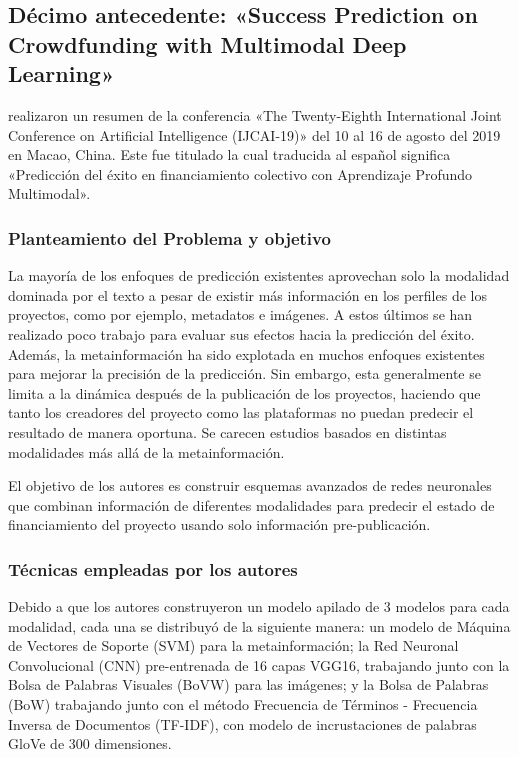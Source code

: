 \subsection{Décimo antecedente: «Success Prediction on Crowdfunding with Multimodal Deep Learning» \citep*{pr_cheng2019deeplearning}}
\citeauthor{pr_cheng2019deeplearning} realizaron un resumen de la conferencia «The Twenty-Eighth International Joint Conference on Artificial Intelligence (IJCAI-19)» del 10 al 16 de agosto del 2019 en Macao, China. Este fue titulado  la cual traducida al español significa «Predicción del éxito en financiamiento colectivo con Aprendizaje Profundo Multimodal».

\subsubsection{Planteamiento del Problema y objetivo}
La mayoría de los enfoques de predicción existentes aprovechan solo la modalidad dominada por el texto a pesar de existir más información en los perfiles de los proyectos, como por ejemplo, metadatos e imágenes. A estos últimos se han realizado poco trabajo para evaluar sus efectos hacia la predicción del éxito. Además, la metainformación ha sido explotada en muchos enfoques existentes para mejorar la precisión de la predicción. Sin embargo, esta generalmente se limita a la dinámica después de la publicación de los proyectos, haciendo que tanto los creadores del proyecto como las plataformas no puedan predecir el resultado de manera oportuna. Se carecen estudios basados en distintas modalidades más allá de la metainformación.

El objetivo de los autores es construir esquemas avanzados de redes neuronales que combinan información de diferentes modalidades para predecir el estado de financiamiento del proyecto usando solo información pre-publicación.

\subsubsection{Técnicas empleadas por los autores}
Debido a que los autores construyeron un modelo apilado de 3 modelos para cada modalidad, cada una se distribuyó de la siguiente manera: un modelo de Máquina de Vectores de Soporte (SVM) para la metainformación; la Red Neuronal Convolucional (CNN) pre-entrenada de 16 capas VGG16, trabajando junto con la Bolsa de Palabras Visuales (BoVW) para las imágenes; y la Bolsa de Palabras (BoW) trabajando junto con el método Frecuencia de Términos - Frecuencia Inversa de Documentos (TF-IDF), con modelo de incrustaciones de palabras GloVe de 300 dimensiones.

